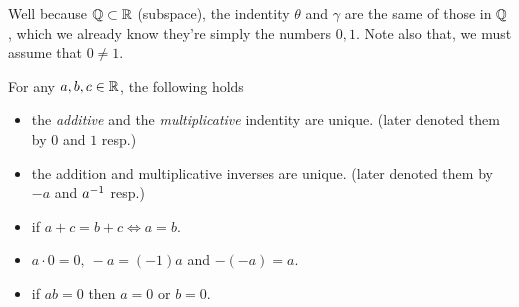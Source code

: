 Well because $\mathbb{Q}\subset\mathbb{R}$ (subspace), the indentity $\theta$ 
and $\gamma$ are the same of those in $\mathbb{Q}$, which we already
know they're simply the numbers $0,1$. 
Note also that, we must assume that $0\neq 1$.
\begin{theorem}
  For any $a,b,c\in\mathbb{R}$, the following holds
  \begin{itemize}
    \item the \emph{additive} and the \emph{multiplicative} 
      indentity are unique. 
      (later denoted them by $0$ and $1$ resp.)
    \item the addition and multiplicative inverses are
      unique. (later denoted them by $-a$ and $a^{-1}$ resp.)
    \item if $a+c=b+c\iff a=b$.
    \item $a\cdot 0=0,~-a=(-1)a$ and $-(-a)=a$.
    \item if $ab=0$ then $a=0$ or $b=0$.
  \end{itemize}
\end{theorem}







